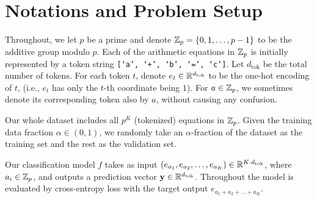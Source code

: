 \section{Notations and Problem Setup}
\label{sec:prelim}

Throughout, we let $p$ be a prime and denote $\mathbb{Z}_p = \{0, 1, \dots, p-1\}$ to be the additive group modulo $p$.
Each of the arithmetic equations in $\mathbb{Z}_p$ is initially represented by a token string \texttt{[`a', `+', `b', `=', `c']}.
Let $d_{\mathrm{tok}}$ be the total number of tokens.
For each token $t$, denote $e_t \in \mathbb{R}^{d_{\mathrm{tok}}}$ to be the one-hot encoding of $t$, (i.e., $e_t$ has only the $t$-th coordinate being $1$).
For $a \in \mathbb{Z}_p$, we sometimes denote its corresponding token also by $a$, without causing any confusion.

Our whole dataset includes all $p^K$ (tokenized) equations in $\mathbb{Z}_p$.
Given the training data fraction $\alpha\in(0,1)$, we randomly take an $\alpha$-fraction of the dataset as the training set and the rest as the validation set.

Our classification model $f$ takes as input $(e_{a_1}, e_{a_2}, \dots, e_{a_K}) \in \mathbb{R}^{K \cdot {d_{\mathrm{tok}}}}$, where $a_i \in \mathbb{Z}_p$, and outputs a prediction vector $\mathbf{y} \in \mathbb{R}^{{d_{\mathrm{tok}}}}$.
Throughout the model is evaluated by cross-entropy loss with the target output $e_{a_1 + a_2 + \dots + a_K}$.





